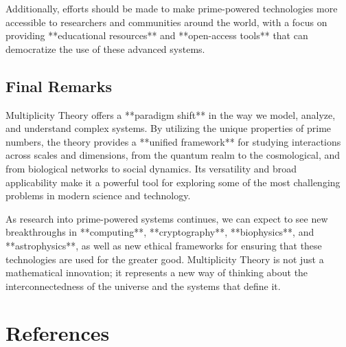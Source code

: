\documentclass[12pt]{article}
\begin{document}
Additionally, efforts should be made to make prime-powered technologies more accessible to researchers and communities around the world, with a focus on providing **educational resources** and **open-access tools** that can democratize the use of these advanced systems.

\subsection{Final Remarks}

Multiplicity Theory offers a **paradigm shift** in the way we model, analyze, and understand complex systems. By utilizing the unique properties of prime numbers, the theory provides a **unified framework** for studying interactions across scales and dimensions, from the quantum realm to the cosmological, and from biological networks to social dynamics. Its versatility and broad applicability make it a powerful tool for exploring some of the most challenging problems in modern science and technology.

As research into prime-powered systems continues, we can expect to see new breakthroughs in **computing**, **cryptography**, **biophysics**, and **astrophysics**, as well as new ethical frameworks for ensuring that these technologies are used for the greater good. Multiplicity Theory is not just a mathematical innovation; it represents a new way of thinking about the interconnectedness of the universe and the systems that define it.


\section{References}
\end{document}
